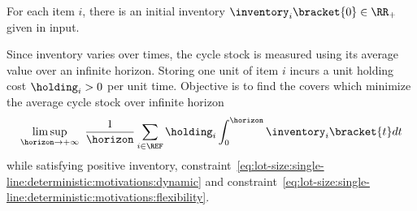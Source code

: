 For each item $i$, there is an initial inventory $\inventory_i\bracket{0}\in\RR_+$ given in input.


Since inventory varies over times, the cycle stock is measured using its average value over an infinite horizon.
Storing one unit of item $i$ incurs a unit holding cost $\holding_i>0$ per unit time.
Objective is to find the covers which minimize the average cycle stock over infinite horizon
\begin{equation}
  \limsup_{\horizon\rightarrow+\infty}\ \frac{1}{\horizon} \sum_{i\in\REF} \holding_i \int_0^{\horizon}\inventory_i\bracket{t}dt
\end{equation}
while satisfying positive inventory, constraint~\eqref{eq:lot-size:single-line:deterministic:motivations:dynamic} and constraint~\eqref{eq:lot-size:single-line:deterministic:motivations:flexibility}.



\medskip


